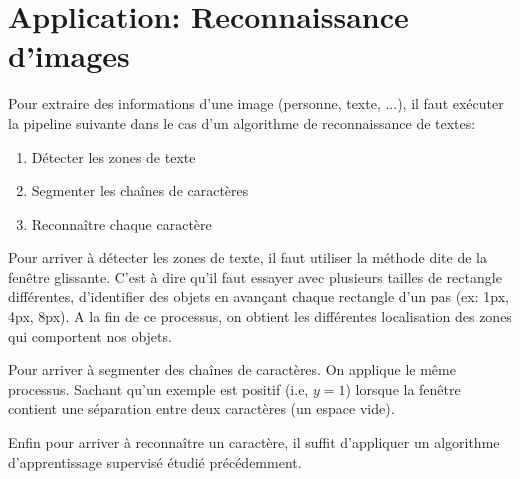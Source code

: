 \documentclass{article}
\theoremstyle{definition}
\begin{document}
\section{Application: Reconnaissance d'images}
Pour extraire des informations d'une image (personne, texte, ...), il faut exécuter la pipeline suivante dans le cas d'un algorithme de reconnaissance de textes:
\begin{enumerate}
\item Détecter les zones de texte
\item Segmenter les chaînes de caractères
\item Reconnaître chaque caractère
\end{enumerate}
Pour arriver à détecter les zones de texte, il faut utiliser la méthode dite de la fenêtre glissante. C'est à dire qu'il faut essayer avec plusieurs tailles de rectangle différentes, d'identifier des objets en avançant chaque rectangle d'un pas (ex: 1px, 4px, 8px). A la fin de ce processus, on obtient les différentes localisation des zones qui comportent nos objets.\par
Pour arriver à segmenter des chaînes de caractères. On applique le même processus. Sachant qu'un exemple est positif (i.e, $y=1$) lorsque la fenêtre contient une séparation entre deux caractères (un espace vide).\par
Enfin pour arriver à reconnaître un caractère, il suffit d'appliquer un algorithme d'apprentissage supervisé étudié précédemment.
\end{document}
